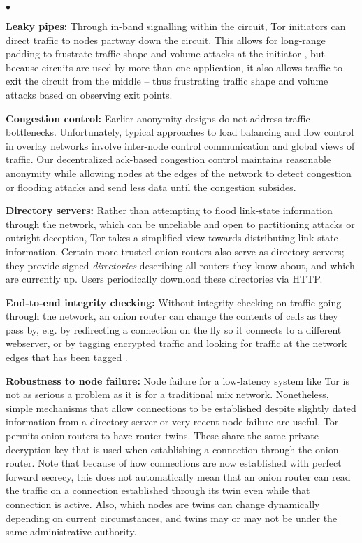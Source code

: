 \documentclass[times,10pt,twocolumn]{article}
\newenvironment{tightlist}{\begin{list}{$\bullet$}{
  \setlength{\itemsep}{0mm}
    \setlength{\parsep}{0mm}
    }}{\end{list}}
\begin{document}
\begin{tightlist}
\item \textbf{Leaky pipes:} Through in-band signalling within the
  circuit, Tor initiators can direct traffic to nodes partway down the
  circuit. This allows for long-range padding to frustrate traffic
  shape and volume attacks at the initiator \cite{defensive-dropping},
  but because circuits are used by more than one application, it also
  allows traffic to exit the circuit from the middle -- thus
  frustrating traffic shape and volume attacks based on observing exit
  points.

\item \textbf{Congestion control:} Earlier anonymity designs do not
address traffic bottlenecks. Unfortunately, typical approaches to load
balancing and flow control in overlay networks involve inter-node control
communication and global views of traffic. Our decentralized ack-based
congestion control maintains reasonable anonymity while allowing nodes
at the edges of the network to detect congestion or flooding attacks
and send less data until the congestion subsides.

\item \textbf{Directory servers:} Rather than attempting to flood
link-state information through the network, which can be unreliable and
open to partitioning attacks or outright deception, Tor takes a simplified
view towards distributing link-state information. Certain more trusted
onion routers also serve as directory servers; they provide signed
\emph{directories} describing all routers they know about, and which
are currently up. Users periodically download these directories via HTTP.

\item \textbf{End-to-end integrity checking:} Without integrity checking
on traffic going through the network, an onion router can change the
contents of cells as they pass by, e.g. by redirecting a connection on
the fly so it connects to a different webserver, or by tagging encrypted
traffic and looking for traffic at the network edges that has been
tagged \cite{minion-design}.

\item \textbf{Robustness to node failure:} Node failure for a
  low-latency system like Tor is not as serious a problem as it is for
  a traditional mix network. Nonetheless, simple mechanisms that allow
  connections to be established despite slightly dated information
  from a directory server or very recent node failure are useful.  Tor
  permits onion routers to have router twins. These share the same
  private decryption key that is used when establishing a connection
  through the onion router. Note that because of how connections are
  now established with perfect forward secrecy, this does not
  automatically mean that an onion router can read the traffic on a
  connection established through its twin even while that connection
  is active. Also, which nodes are twins can change dynamically
  depending on current circumstances, and twins may or may not be
  under the same administrative authority.


\end{tightlist}
\end{document}
